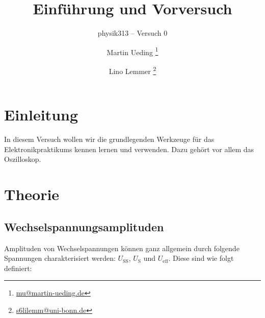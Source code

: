 




\subject{Praktikumsprotokoll}
\title{Einführung und Vorversuch}
\subtitle{physik313 – Versuch 0}
\author{
	Martin Ueding \footnote{\href{mailto:mu@martin-ueding.de}{mu@martin-ueding.de}}
	\and
	Lino Lemmer \footnote{\href{mailto:s6lilemm@uni-bonn.de}{s6lilemm@uni-bonn.de}}
}
\publishers{Gruppe 3 -- A -- Brezina}




\maketitle

\tableofcontents
\newpage


\section{Einleitung}

In diesem Versuch wollen wir die grundlegenden Werkzeuge für das
Elektronikpraktikums kennen lernen und verwenden. Dazu gehört vor allem das
Oszilloskop.


\section{Theorie}

\subsection{Wechselspannungsamplituden}

Amplituden von Wechselspannungen können ganz allgemein durch folgende
Spannungen charakterisiert werden: $U_\text{SS}$, $U_\text{S}$ und
$U_\text{eff}$. Diese sind wie folgt definiert:

